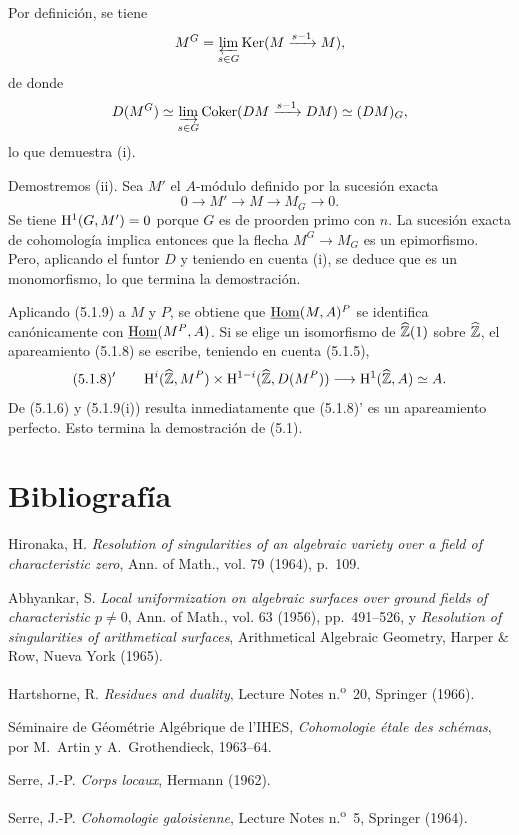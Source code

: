 \begin{prooftext}[Demostración]
Por definición, se tiene
\[
M^G=\varprojlim_{s\in G}\operatorname{Ker}(M\xrightarrow{s-1}M),
\]
de donde
\[
D(M^G)\simeq \varinjlim_{s\in G}\operatorname{Coker}(DM\xrightarrow{s-1}DM)\simeq (DM)_G,
\]
lo que demuestra (i).

Demostremos (ii). Sea $M'$ el $A$-módulo definido por la sucesión exacta
\[
0\longrightarrow M'\longrightarrow M\longrightarrow M_G\longrightarrow0.
\]
Se tiene $\mathrm{H}^1(G,M')=0$ porque $G$ es de proorden primo con $n$. La sucesión exacta de cohomología implica entonces que la flecha $M^G\to M_G$ es un epimorfismo. Pero, aplicando el funtor $D$ y teniendo en cuenta (i), se deduce que es un monomorfismo, lo que termina la demostración.
\end{prooftext}

Aplicando (5.1.9) a $M$ y $P$, se obtiene que $\underline{\operatorname{Hom}}(M,A)^P$ se identifica canónicamente con $\underline{\operatorname{Hom}}(M^P,A)$. Si se elige un isomorfismo de $\widehat{\mathbb{Z}}(1)$ sobre $\widehat{\mathbb{Z}}$, el apareamiento (5.1.8) se escribe, teniendo en cuenta (5.1.5),
\[
(5.1.8)'\qquad \mathrm{H}^i(\widehat{\mathbb{Z}},M^P)\times\mathrm{H}^{1-i}(\widehat{\mathbb{Z}},D(M^P))\longrightarrow\mathrm{H}^1(\widehat{\mathbb{Z}},A)\simeq A.
\]
De (5.1.6) y (5.1.9(i)) resulta inmediatamente que (5.1.8)' es un apareamiento perfecto. Esto termina la demostración de (5.1).

\section*{Bibliografía}

\begin{description}[leftmargin=2.5cm,style=nextline]
\item[{[2]}] Hironaka, H. \emph{Resolution of singularities of an algebraic variety over a field of characteristic zero}, Ann. of Math., vol. 79 (1964), p.~109.
\item[{[1]}] Abhyankar, S. \emph{Local uniformization on algebraic surfaces over ground fields of characteristic $p\ne0$}, Ann. of Math., vol. 63 (1956), pp.~491--526, y \emph{Resolution of singularities of arithmetical surfaces}, Arithmetical Algebraic Geometry, Harper \& Row, Nueva York (1965).
\item[{[H]}] Hartshorne, R. \emph{Residues and duality}, Lecture Notes n.\textsuperscript{o}~20, Springer (1966).
\item[{[SGAA]}] Séminaire de Géométrie Algébrique de l'IHES, \emph{Cohomologie étale des schémas}, por M.~Artin y A.~Grothendieck, 1963--64.
\item[{[CL]}] Serre, J.-P. \emph{Corps locaux}, Hermann (1962).
\item[{[CG]}] Serre, J.-P. \emph{Cohomologie galoisienne}, Lecture Notes n.\textsuperscript{o}~5, Springer (1964).
\end{description}
